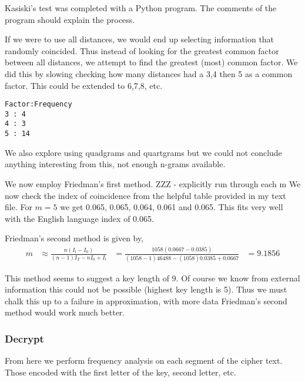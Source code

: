 \documentclass{article}
\begin{document}
Kasiski's test was completed with a Python program. The comments of the program
should explain the process.


If we were to use all distances, we would end up selecting information that
randomly coincided. Thus instead of looking for the greatest common factor
between all distances, we attempt to find the greatest (most) common factor.
We did this by slowing checking how many distances had a 3,4 then
5 as a common factor. This could be extended to 6,7,8, etc.
\begin{verbatim}
Factor:Frequency
3 : 4
4 : 3
5 : 14
\end{verbatim}

We also explore using quadgrams and quartgrams but we could
not conclude anything interesting from this, not enough n-grams available.

We now employ Friedman's first method.
ZZZ - explicitly run through each m
We now check the index of coincidence from the helpful table provided in
my text file. For $m=5$ we get 0.065, 0.065, 0.064, 0.061 and 0.065. This
fits very well with the English language index of 0.065.

Friedman's second method is given by,
\begin{align*}
    m &\approx \frac{n(I_l - I_0)}{(n-1)I_T - nI_0 + I_l}
    &= \frac{1058(0.0667 - 0.0385)}{(1058-1)46488 - (1058)0.0385 + 0.0667}
    &= 9.1856
\end{align*}

This method seems to suggest a key length of 9. Of course we know
from external information this could not be possible (highest key length is 5).
Thus we must chalk this up to a failure in approximation, with more data
Friedman's second method would work much better.

\subsubsection{Decrypt}
From here we perform frequency analysis on each segment of the cipher text.
Those encoded with the first letter of the key, second letter, etc.

\end{document}
